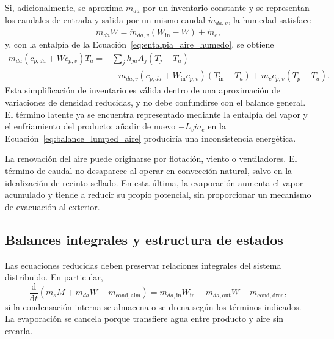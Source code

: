 Si, adicionalmente, se aproxima $m_{da}$ por un inventario constante y se representan los caudales de entrada y salida por un mismo caudal $\dot m_{da,v}$, la humedad satisface
\begin{equation}
m_{da}\dot W=\dot m_{da,v}(W_{\mathrm{in}}-W)+\dot m_e,
\label{eq:balance_humedad_simplificado}
\end{equation}
y, con la entalpía de la Ecuación~\eqref{eq:entalpia_aire_humedo}, se obtiene
\begin{equation}
\begin{aligned}
m_{da}(c_{p,da}+Wc_{p,v})\dot T_a
={}&\sum_jh_{ja}A_j(T_j-T_a)\\
&+\dot m_{da,v}(c_{p,da}+W_{\mathrm{in}}c_{p,v})(T_{\mathrm{in}}-T_a)
+\dot m_ec_{p,v}(T_p-T_a).
\end{aligned}
\label{eq:balance_lumped_aire}
\end{equation}
Esta simplificación de inventario es válida dentro de una aproximación de variaciones de densidad reducidas, y no debe confundirse con el balance general. El término latente ya se encuentra representado mediante la entalpía del vapor y el enfriamiento del producto: añadir de nuevo $-L_v\dot m_e$ en la Ecuación~\eqref{eq:balance_lumped_aire} produciría una inconsistencia energética.

La renovación del aire puede originarse por flotación, viento o ventiladores. El término de caudal no desaparece al operar en convección natural, salvo en la idealización de recinto sellado. En esta última, la evaporación aumenta el vapor acumulado y tiende a reducir su propio potencial, sin proporcionar un mecanismo de evacuación al exterior.

\subsection{Balances integrales y estructura de estados}

Las ecuaciones reducidas deben preservar relaciones integrales del sistema distribuido. En particular,
\begin{equation}
\frac{\mathrm{d}}{\mathrm{d}t}(m_sM+m_{da}W+m_{\mathrm{cond},\mathrm{alm}})
=\dot m_{da,\mathrm{in}}W_{\mathrm{in}}
-\dot m_{da,\mathrm{out}}W-\dot m_{\mathrm{cond},\mathrm{dren}},
\label{eq:agua_total}
\end{equation}
si la condensación interna se almacena o se drena según los términos indicados. La evaporación se cancela porque transfiere agua entre producto y aire sin crearla.

